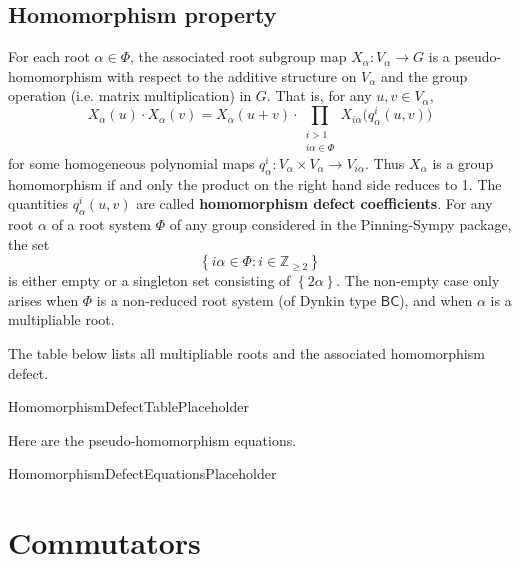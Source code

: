 \documentclass[11pt]{article}
\newcommand{\noi}{\noindent}
\newcommand{\tbf}{\textbf}
\newcommand{\lb}{\left\{}
\newcommand{\rb}{\right\}}
\newcommand{\Z}{\mathbb{Z}}
\theoremstyle{definition}
\newif\ifrootsystemreduced
\begin{document}
\subsection{Homomorphism property}

\noi For each root $\alpha \in \Phi$, the associated root subgroup map $X_\alpha:V_\alpha \to G$ is a pseudo-homomorphism with respect to the additive structure on $V_\alpha$ and the group operation (i.e. matrix multiplication) in $G$. That is, for any $u,v \in V_\alpha$,
\begin{equation}
\label{pseudo homomorphism}
	X_\alpha(u) \cdot X_\alpha(v) = X_\alpha(u+v) \cdot \prod_{\substack{i > 1 \\ i \alpha \in \Phi}} X_{i \alpha} \Big( q^i_\alpha(u,v) \Big)
\end{equation}
for some homogeneous polynomial maps $q^i_\alpha:V_\alpha \times V_\alpha \to V_{i \alpha}$. Thus $X_\alpha$ is a group homomorphism if and only the product on the right hand side reduces to 1. The quantities $q^i_\alpha(u,v)$ are called \tbf{homomorphism defect coefficients}. For any root $\alpha$ of a root system $\Phi$ of any group considered in the Pinning-Sympy package, the set
\[
	\lb i \alpha \in \Phi : i \in \Z_{\ge 2} \rb
\]
is either empty or a singleton set consisting of $\lb 2 \alpha \rb$. The non-empty case only arises when $\Phi$ is a non-reduced root system (of Dynkin type $\mathsf{BC}$), and when $\alpha$ is a multipliable root. 

\ifrootsystemreduced
Since the root system for this group is reduced, there are no multipliable roots and the product is always empty, hence each $X_\alpha$ is a group homomorphism there are no homomorphism defect coefficients.
\else
The table below lists all multipliable roots and the associated homomorphism defect.

\bigskip

HomomorphismDefectTablePlaceholder

\bigskip

\noi Here are the pseudo-homomorphism equations.

HomomorphismDefectEquationsPlaceholder

\fi

\newpage
\section{Commutators}
\end{document}
